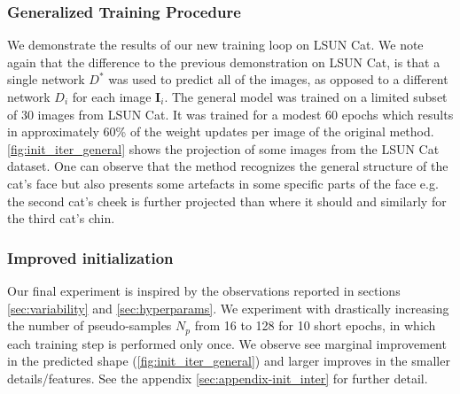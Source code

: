 \subsubsection{Generalized Training Procedure}
\label{sec:general}
We demonstrate the results of our new training loop on LSUN Cat. We note again that the difference to the previous demonstration on LSUN Cat, is that a single network $D^*$ was used to predict all of the images, as opposed to a different network $D_i$ for each image $\mathbf{I}_i$. The general model was trained on a limited subset of 30 images from LSUN Cat. It was trained for a modest $60$ epochs which results in approximately 60\% of the weight updates per image of the original method. \autoref{fig:init_iter_general} shows the projection of some images from the LSUN Cat dataset. One can observe that the method recognizes the general structure of the cat's face but also presents some artefacts in some specific parts of the face e.g. the second cat's cheek is further projected than where it should and similarly for the third cat's chin.

\subsubsection{Improved initialization}
\label{sec:init_iter}
Our final experiment is inspired by the observations reported in sections \ref{sec:variability} and \ref{sec:hyperparams}. We experiment with drastically increasing the number of pseudo-samples $N_{p}$ from 16 to 128 for 10 short epochs, in which each training step is performed only once. We observe see marginal improvement in the predicted shape (\autoref{fig:init_iter_general}) and larger improves in the smaller details/features. See the appendix \ref{sec:appendix-init_inter} for further detail.

